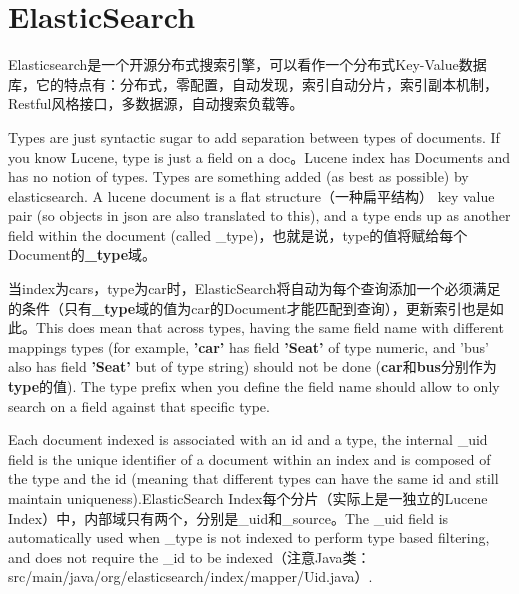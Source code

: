 \section{ElasticSearch}
\par Elasticsearch是一个开源分布式搜索引擎，可以看作一个分布式Key-Value数据库，它的特点有：分布式，零配置，自动发现，索引自动分片，索引副本机制，Restful风格接口，多数据源，自动搜索负载等。
\par Types are just syntactic sugar to add separation between types of documents. If you know Lucene, type is just a field on a doc。Lucene index has Documents and has no notion of types. Types are something added (as best as possible) by elasticsearch. A lucene document is a flat structure（一种扁平结构） key value pair (so objects in json are also translated to this), and a type ends up as another field within the document (called \_type)，也就是说，type的值将赋给每个Document的\textbf{\_type}域。
\par 当index为cars，type为car时，ElasticSearch将自动为每个查询添加一个必须满足的条件（只有\textbf{\_type}域的值为car的Document才能匹配到查询），更新索引也是如此。This does mean that across types, having the same field name with different mappings types (for example, \textbf{'car'} has field \textbf{'Seat'} of type numeric, and 'bus' also has field \textbf{'Seat'} but of type string) should not be done (\textbf{car}和\textbf{bus}分别作为\textbf{type}的值). The type prefix when you define the field name should allow to only search on a field against that specific type.
\par Each document indexed is associated with an id and a type, the internal \_uid field is the unique identifier of a document within an index and is composed of the type and the id (meaning that different types can have the same id and still maintain uniqueness).ElasticSearch Index每个分片（实际上是一独立的Lucene Index）中，内部域只有两个，分别是\_uid和\_source。The \_uid field is automatically used when \_type is not indexed to perform type based filtering, and does not require the \_id to be indexed（注意Java类：src/main/java/org/elasticsearch/index/mapper/Uid.java）.
